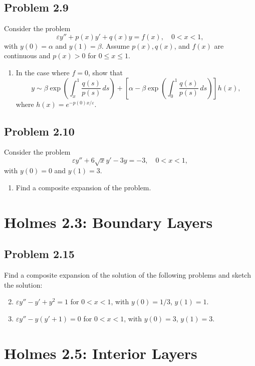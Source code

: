 \documentclass[12pt]{amsart}
\begin{document}
\subsection*{Problem 2.9}
Consider the problem
\[
\varepsilon y'' + p(x)y' + q(x)y = f(x), \quad 0 < x < 1,
\]
with $y(0) = \alpha$ and $y(1) = \beta$. Assume $p(x), q(x)$, and $f(x)$ are
continuous and $p(x) > 0$ for $0 \le x \le 1$.
\begin{enumerate}[label=(\alph*)]
  \item In the case where $f = 0$, show that
  \[
  y \sim \beta \exp\left( \int_x^1 \frac{q(s)}{p(s)}\, ds \right) + \left[
  \alpha - \beta \exp\left( \int_0^1 \frac{q(s)}{p(s)}\, ds \right) \right]
  h(x),
  \]
  where $h(x) = e^{-p(0)x/\varepsilon}$.
\end{enumerate}

\subsection*{Problem 2.10}
Consider the problem
\[
\varepsilon y'' + 6\sqrt{x}y' - 3y = -3, \quad 0 < x < 1,
\]
with $y(0) = 0$ and $y(1) = 3$.
\begin{enumerate}[label=(\alph*)]
  \item Find a composite expansion of the problem.
\end{enumerate}

\section*{Holmes 2.3: Boundary Layers}

\subsection*{Problem 2.15}
Find a composite expansion of the solution of the following problems
and sketch the solution:
\begin{enumerate}[label=(\alph*)]
  \setcounter{enumi}{1}
  \item $\varepsilon y'' - y' + y^2 = 1$ for $0 < x < 1$, with $y(0) = 1/3$,
    $y(1) = 1$.
  
  \setcounter{enumi}{4}
  \item $\varepsilon y'' - y(y' + 1) = 0$ for $0 < x < 1$, with $y(0) = 3$,
    $y(1) = 3$.
\end{enumerate}

\section*{Holmes 2.5: Interior Layers}
\end{document}
